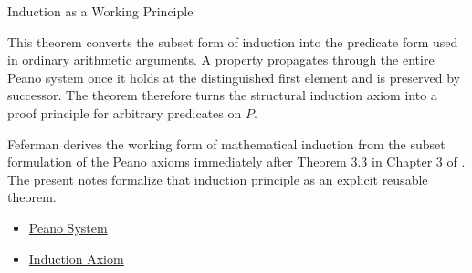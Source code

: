 \begin{topicbox}{Induction as a Working Principle}
\begin{remark*}[Interpretation]
This theorem converts the subset form of induction into the predicate form
used in ordinary arithmetic arguments. A property propagates through the
entire Peano system once it holds at the distinguished first element and is
preserved by successor. The theorem therefore turns the structural induction
axiom into a proof principle for arbitrary predicates on $P$.
\end{remark*}

\begin{remark*}
Feferman derives the working form of mathematical induction from the subset
formulation of the Peano axioms immediately after Theorem 3.3 in Chapter 3 of
\citet{FefermanNumberSystems1964}. The present notes formalize that induction
principle as an explicit reusable theorem.
\end{remark*}

\begin{remark*}[Dependencies]
\begin{itemize}
  \item \hyperref[def:peano-system]{Peano System}
  \item \hyperref[ax:peano-induction]{Induction Axiom}
\end{itemize}
\end{remark*}
\end{topicbox}

